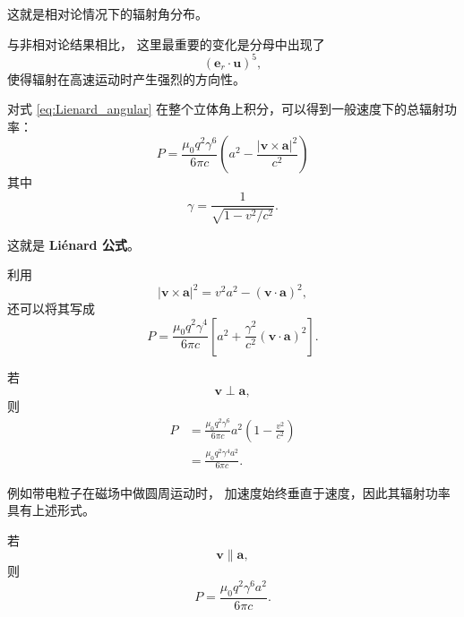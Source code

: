 这就是相对论情况下的辐射角分布。

与非相对论结果相比，
这里最重要的变化是分母中出现了
\begin{equation}
    (\boldsymbol{e}_r\cdot\boldsymbol u)^5,
\end{equation}
使得辐射在高速运动时产生强烈的方向性。

对式 \eqref{eq:Lienard_angular}
在整个立体角上积分，可以得到一般速度下的总辐射功率：
\begin{equation}
    \boxed{
    P
    =
    \frac{\mu_0q^2\gamma^6}{6\pi c}
    \left(
        a^2
        -
        \frac{
            |\boldsymbol v\times\boldsymbol a|^2
        }{c^2}
    \right)
    }
    \label{eq:Lienard}
\end{equation}
其中
\begin{equation}
    \gamma
    =
    \frac{1}
    {\sqrt{1-v^2/c^2}}.
\end{equation}

这就是
\textbf{Liénard 公式}。

利用
\begin{equation}
    |\boldsymbol v\times\boldsymbol a|^2
    =
    v^2a^2-(\boldsymbol v\cdot\boldsymbol a)^2,
\end{equation}
还可以将其写成
\begin{equation}
    \boxed{
    P
    =
    \frac{\mu_0q^2\gamma^4}{6\pi c}
    \left[
        a^2
        +
        \frac{\gamma^2}{c^2}
        (\boldsymbol v\cdot\boldsymbol a)^2
    \right]
    }.
\end{equation}

若
\begin{equation}
    \boldsymbol v\perp\boldsymbol a,
\end{equation}
则
\begin{align}
    P
    &=
    \frac{\mu_0q^2\gamma^6}{6\pi c}
    a^2
    \left(
        1-\frac{v^2}{c^2}
    \right)
    \\
    &=
    \boxed{
    \frac{\mu_0q^2\gamma^4a^2}
    {6\pi c}
    }.
\end{align}

例如带电粒子在磁场中做圆周运动时，
加速度始终垂直于速度，因此其辐射功率具有上述形式。

若
\begin{equation}
    \boldsymbol v\parallel\boldsymbol a,
\end{equation}
则
\begin{equation}
    \boxed{
    P=\frac{\mu_0q^2\gamma^6a^2}{6\pi c}
    }.
\end{equation}

